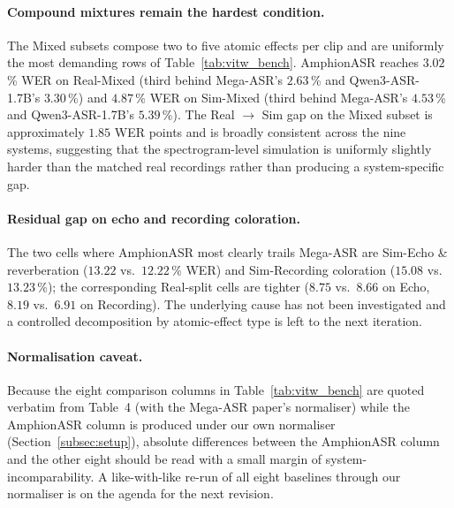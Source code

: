 \paragraph{Compound mixtures remain the hardest condition.}
The Mixed subsets compose two to five atomic effects per clip and
are uniformly the most demanding rows of
Table~\ref{tab:vitw_bench}. AmphionASR reaches $3.02$\,\% WER on
Real-Mixed (third behind Mega-ASR's $2.63$\,\% and Qwen3-ASR-1.7B's
$3.30$\,\%) and $4.87$\,\% WER on Sim-Mixed (third behind
Mega-ASR's $4.53$\,\% and Qwen3-ASR-1.7B's $5.39$\,\%). The Real
$\!\to\!$ Sim gap on the Mixed subset is approximately $1.85$ WER
points and is broadly consistent across the nine systems,
suggesting that the spectrogram-level simulation is uniformly
slightly harder than the matched real recordings rather than
producing a system-specific gap.

\paragraph{Residual gap on echo and recording coloration.}
The two cells where AmphionASR most clearly trails Mega-ASR are
Sim-Echo \& reverberation ($13.22$ vs.\ $12.22$\,\% WER) and
Sim-Recording coloration ($15.08$ vs.\ $13.23$\,\%); the
corresponding Real-split cells are tighter ($8.75$ vs.\ $8.66$ on
Echo, $8.19$ vs.\ $6.91$ on Recording). The underlying cause has
not been investigated and a controlled decomposition by
atomic-effect type is left to the next iteration.

\paragraph{Normalisation caveat.}
Because the eight comparison columns in Table~\ref{tab:vitw_bench}
are quoted verbatim from \cite{xie2026mega} Table~4 (with the
Mega-ASR paper's normaliser) while the AmphionASR column is
produced under our own normaliser
(Section~\ref{subsec:setup}), absolute differences between the
AmphionASR column and the other eight should be read with a small
margin of system-incomparability. A like-with-like re-run of all
eight baselines through our normaliser is on the agenda for the
next revision.
